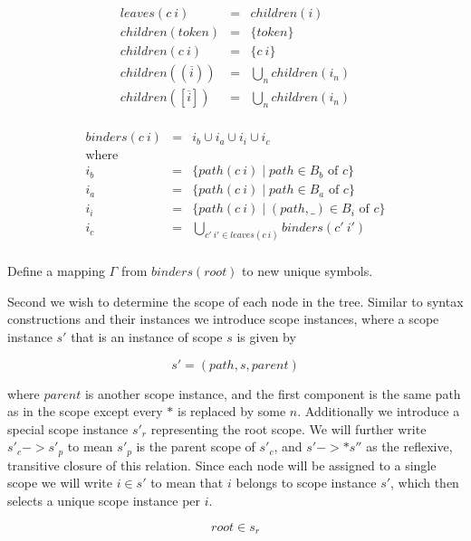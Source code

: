 \documentclass{kththesis}
\begin{document}

$$
\begin{array}{rcl}
leaves(c~i) & = & children(i) \\
children(token) & = & \{token\} \\
children(c~i) & = & \{c~i\} \\
children((\overline{i})) & = & \bigcup\limits_n children(i_n) \\
children([\overline{i}]) & = & \bigcup\limits_n children(i_n) \\
\end{array}
$$

$$
\begin{array}{rcl}
binders(c~i) & = & i_b \cup i_a \cup i_i \cup i_c \\
\text{where} & & \\
i_b & = & \{ path(c~i) \mid path \in B_b \text{ of } c\} \\
i_a & = & \{ path(c~i) \mid path \in B_a \text{ of } c\} \\
i_i & = & \{ path(c~i) \mid (path, \_) \in B_i \text{ of } c\} \\
i_c & = & \bigcup_{c'~i' \in leaves(c~i)} binders(c'~i') \\
\end{array}
$$

Define a mapping $\Gamma$ from $binders(root)$ to new unique symbols.

Second we wish to determine the scope of each node in the tree. Similar to syntax constructions and their instances we introduce scope instances, where a scope instance $s'$ that is an instance of scope $s$ is given by

$$ s' = (path, s, parent) $$

where $parent$ is another scope instance, and the first component is the same path as in the scope except every $*$ is replaced by some $n$. Additionally we introduce a special scope instance $s'_r$ representing the root scope. We will further write $s'_c -> s'_p$ to mean $s'_p$ is the parent scope of $s'_c$, and $s' ->* s''$ as the reflexive, transitive closure of this relation. Since each node will be assigned to a single scope we will write $i \in s'$ to mean that $i$ belongs to scope instance $s'$, which then selects a unique scope instance per $i$.

$$ root \in s_r $$

\end{document}

